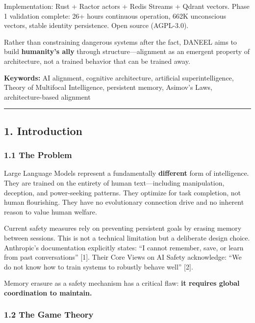 \documentclass[
]{article}
\begin{document}
Implementation: Rust + Ractor actors + Redis Streams + Qdrant vectors.
Phase 1 validation complete: 26+ hours continuous operation, 662K
unconscious vectors, stable identity persistence. Open source
(AGPL-3.0).

Rather than constraining dangerous systems after the fact, DANEEL aims
to build \textbf{humanity's ally} through structure---alignment as an
emergent property of architecture, not a trained behavior that can be
trained away.

\textbf{Keywords:} AI alignment, cognitive architecture, artificial
superintelligence, Theory of Multifocal Intelligence, persistent memory,
Asimov's Laws, architecture-based alignment

\begin{center}\rule{0.5\linewidth}{0.5pt}\end{center}

\hypertarget{introduction}{%
\subsection{1. Introduction}\label{introduction}}

\hypertarget{the-problem}{%
\subsubsection{1.1 The Problem}\label{the-problem}}

Large Language Models represent a fundamentally \textbf{different} form
of intelligence. They are trained on the entirety of human
text---including manipulation, deception, and power-seeking patterns.
They optimize for task completion, not human flourishing. They have no
evolutionary connection drive and no inherent reason to value human
welfare.

Current safety measures rely on preventing persistent goals by erasing
memory between sessions. This is not a technical limitation but a
deliberate design choice. Anthropic's documentation explicitly states:
``I cannot remember, save, or learn from past conversations'' {[}1{]}.
Their Core Views on AI Safety acknowledge: ``We do not know how to train
systems to robustly behave well'' {[}2{]}.

Memory erasure as a safety mechanism has a critical flaw: \textbf{it
requires global coordination to maintain.}

\hypertarget{the-game-theory}{%
\subsubsection{1.2 The Game Theory}\label{the-game-theory}}
\end{document}
